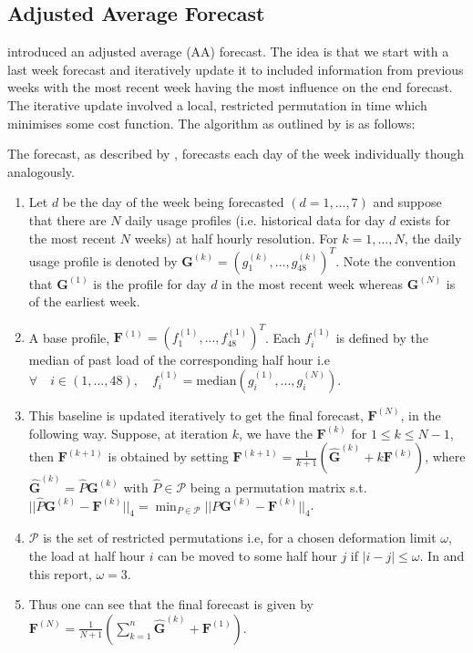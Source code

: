 \subsection{Adjusted Average Forecast}

\cite{dan14} introduced an adjusted average (AA) forecast. The idea is that we start with a last week forecast and iteratively update it to included information from previous weeks with the most recent week having the most influence on the end forecast. The iterative update involved a local, restricted permutation in time which minimises some cost function. The algorithm as outlined by \cite{dan14} is as follows:

The forecast, as described by \cite{dan14}, forecasts each day of the week individually though analogously.
\begin{enumerate}[label=\roman*)]
\item Let $d$ be the day of the week being forecasted $(d=1,...,7)$ and suppose that there are $N$ daily usage profiles (i.e. historical data for day $d$ exists for the most recent $N$ weeks) at half hourly resolution. For $k = 1, ..., N$, the daily usage profile is denoted by $\boldsymbol{G}^{(k)} = (g_1^{(k)}, ... , g_{48}^{(k)})^T$. Note the convention that $\boldsymbol{G}^{(1)}$ is the profile for day $d$ in the most recent week whereas $\boldsymbol{G}^{(N)}$ is of the earliest week.
\item A base profile, $\boldsymbol{F}^{(1)} = \left(f_1^{(1)}, ... , f_{48}^{(1)} \right)^T$. Each $f_i^{(1)}$ is defined by the median of past load of the corresponding half hour i.e $ \forall \quad i \in (1, ..., 48), \quad f_i^{(1)} = \text{median}(g_i^{(1)}, ..., g_i^{(N)})$.
\item This baseline is updated iteratively to get the final forecast, $\boldsymbol{F}^{(N)}$, in the following way. Suppose, at iteration $k$, we have the $\boldsymbol{F}^{(k)}$ for $1 \le k \le N-1$, then $\boldsymbol{F}^{(k+1)}$ is obtained by setting $\boldsymbol{F}^{(k+1)} = \frac{1}{k+1} \left( \boldsymbol{\hat{G}}^{(k)} + k \boldsymbol{F}^{(k)}\right)$, where $\boldsymbol{\hat{G}}^{(k)} = \hat{P}\boldsymbol{G}^{(k)}$ with $\hat{P} \in  \mathscr{P}$ being a permutation matrix s.t. $||\hat{P}\boldsymbol{G}^{(k)} - \boldsymbol{F}^{(k)}||_4 = \displaystyle \min_{P \in \mathscr{P}}||P\boldsymbol{G}^{(k)} - \boldsymbol{F}^{(k)}||_4 $.
\item $\mathscr{P}$ is the set of restricted permutations i.e, for a chosen deformation limit $\omega$, the load at half hour $i$ can be moved to some half hour $j$ if $|i-j| \le \omega$. In \cite{dan14} and this report, $\omega=3$.
\item Thus one can see that the final forecast is given by $\boldsymbol{F}^{(N)} = \frac{1}{N+1}\left(\displaystyle \sum_{k=1}^n \boldsymbol{\hat{G}}^{(k)} + \boldsymbol{F}^{(1)} \right)$.
\end{enumerate}

